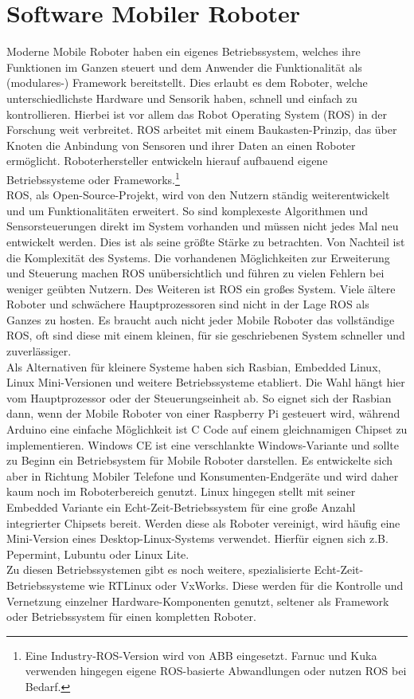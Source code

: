 \documentclass[twoside,11pt, a4paper]{report}
\begin{document}
	
	\section{Software Mobiler Roboter}
	Moderne Mobile Roboter haben ein eigenes Betriebssystem, welches ihre Funktionen im Ganzen steuert und dem Anwender die Funktionalität als (modulares-) Framework bereitstellt. Dies erlaubt es dem Roboter, welche unterschiedlichste Hardware und Sensorik haben, schnell und einfach zu kontrollieren. Hierbei ist vor allem das Robot Operating System (ROS) in der Forschung weit verbreitet. ROS arbeitet mit einem Baukasten-Prinzip, das über Knoten die Anbindung von Sensoren und ihrer Daten an einen Roboter ermöglicht. Roboterhersteller entwickeln hierauf aufbauend eigene Betriebssysteme oder Frameworks.\footnote{Eine Industry-ROS-Version wird von ABB eingesetzt. Farnuc und Kuka verwenden hingegen eigene ROS-basierte Abwandlungen oder nutzen ROS bei Bedarf.}\\
	ROS, als Open-Source-Projekt, wird von den Nutzern ständig weiterentwickelt und um Funktionalitäten erweitert. So sind komplexeste Algorithmen und Sensorsteuerungen direkt im System vorhanden und müssen nicht jedes Mal neu entwickelt werden. Dies ist als seine größte Stärke zu betrachten. Von Nachteil ist die Komplexität des Systems. Die vorhandenen Möglichkeiten zur Erweiterung und Steuerung machen ROS unübersichtlich und führen zu vielen Fehlern bei weniger geübten Nutzern. Des Weiteren ist ROS ein großes System. Viele ältere Roboter und schwächere Hauptprozessoren sind nicht in der Lage ROS als Ganzes zu hosten. Es braucht auch nicht jeder Mobile Roboter das vollständige ROS, oft sind diese mit einem kleinen, für sie geschriebenen System schneller und zuverlässiger. \\
	Als Alternativen für kleinere Systeme haben sich Rasbian, Embedded Linux, Linux Mini-Versionen und weitere Betriebssysteme etabliert. Die Wahl hängt hier vom Hauptprozessor oder der Steuerungseinheit ab. So eignet sich der Rasbian dann, wenn der Mobile Roboter von einer Raspberry Pi gesteuert wird, während Arduino eine einfache Möglichkeit ist C Code auf einem gleichnamigen Chipset zu implementieren. Windows CE ist eine verschlankte Windows-Variante und sollte zu Beginn ein Betriebsystem für Mobile Roboter darstellen. Es entwickelte sich aber in Richtung Mobiler Telefone und Konsumenten-Endgeräte und wird daher kaum noch im Roboterbereich genutzt. Linux hingegen stellt mit seiner Embedded Variante ein Echt-Zeit-Betriebssystem für eine große Anzahl integrierter Chipsets bereit. Werden diese als Roboter vereinigt, wird häufig eine Mini-Version eines Desktop-Linux-Systems verwendet. Hierfür eignen sich z.B. Pepermint, Lubuntu oder Linux Lite.   \\
	Zu diesen Betriebssystemen gibt es noch weitere, spezialisierte Echt-Zeit-Betriebssysteme wie RTLinux oder VxWorks. Diese werden für die Kontrolle und Vernetzung einzelner Hardware-Komponenten genutzt, seltener als Framework oder Betriebssystem für einen kompletten Roboter. \\
	
\end{document}
